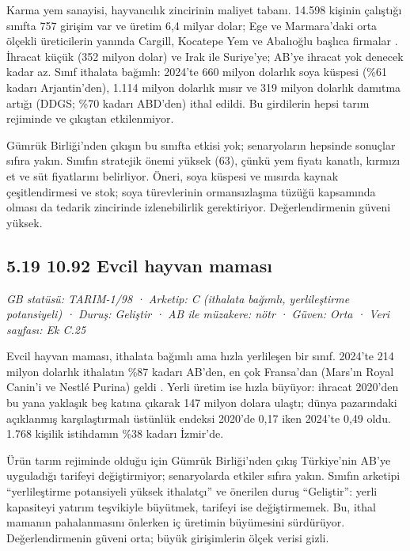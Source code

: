 Karma yem sanayisi, hayvancılık zincirinin maliyet tabanı. 14.598 kişinin çalıştığı sınıfta 757 girişim var ve üretim 6,4 milyar dolar; Ege ve Marmara'daki orta ölçekli üreticilerin yanında Cargill, Kocatepe Yem ve Abalıoğlu başlıca firmalar \etiketH{}. İhracat küçük (352 milyon dolar) ve Irak ile Suriye'ye; AB'ye ihracat yok denecek kadar az. Sınıf ithalata bağımlı: 2024'te 660 milyon dolarlık soya küspesi (\%61 kadarı Arjantin'den), 1.114 milyon dolarlık mısır ve 319 milyon dolarlık damıtma artığı (DDGS; \%70 kadarı ABD'den) ithal edildi. Bu girdilerin hepsi tarım rejiminde ve çıkıştan etkilenmiyor.

Gümrük Birliği'nden çıkışın bu sınıfta etkisi yok; senaryoların hepsinde sonuçlar sıfıra yakın. Sınıfın stratejik önemi yüksek (63), çünkü yem fiyatı kanatlı, kırmızı et ve süt fiyatlarını belirliyor. Öneri, soya küspesi ve mısırda kaynak çeşitlendirmesi ve stok; soya türevlerinin ormansızlaşma tüzüğü kapsamında olması da tedarik zincirinde izlenebilirlik gerektiriyor. Değerlendirmenin güveni yüksek.

\hypertarget{nace_kartlar_10-12-519-1092-evcil-hayvan-mamasux131}{%
\subsection{5.19 10.92 Evcil hayvan maması}\label{nace_kartlar_10-12-519-1092-evcil-hayvan-mamasux131}}

\emph{GB statüsü: TARIM-1/98 · Arketip: C (ithalata bağımlı, yerlileştirme potansiyeli) · Duruş: Geliştir · AB ile müzakere: nötr · Güven: Orta · Veri sayfası: Ek C.25}

Evcil hayvan maması, ithalata bağımlı ama hızla yerlileşen bir sınıf. 2024'te 214 milyon dolarlık ithalatın \%87 kadarı AB'den, en çok Fransa'dan (Mars'ın Royal Canin'i ve Nestlé Purina) geldi \etiketH{}. Yerli üretim ise hızla büyüyor: ihracat 2020'den bu yana yaklaşık beş katına çıkarak 147 milyon dolara ulaştı; dünya pazarındaki açıklanmış karşılaştırmalı üstünlük endeksi 2020'de 0,17 iken 2024'te 0,49 oldu. 1.768 kişilik istihdamın \%38 kadarı İzmir'de.

Ürün tarım rejiminde olduğu için Gümrük Birliği'nden çıkış Türkiye'nin AB'ye uyguladığı tarifeyi değiştirmiyor; senaryolarda etkiler sıfıra yakın. Sınıfın arketipi ``yerlileştirme potansiyeli yüksek ithalatçı'' ve önerilen duruş ``Geliştir'': yerli kapasiteyi yatırım teşvikiyle büyütmek, tarifeyi ise değiştirmemek. Bu, ithal mamanın pahalanmasını önlerken iç üretimin büyümesini sürdürüyor. Değerlendirmenin güveni orta; büyük girişimlerin ölçek verisi gizli.

